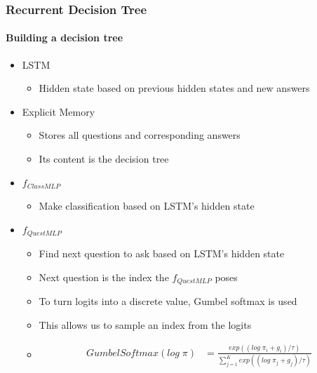 \documentclass[9pt]{beamer}
\begin{document}
\begin{frame}
\frametitle{Recurrent Decision Tree}
\framesubtitle{Building a decision tree}
\begin{itemize}
		\item LSTM
		\begin{itemize}
			\item Hidden state based on previous hidden states and new answers
		\end{itemize}
		\item Explicit Memory
		\begin{itemize}
			\item Stores all questions and corresponding answers
			\item Its content is the decision tree
		\end{itemize}
		\item $f_{ClassMLP}$
		\begin{itemize}
			\item Make classification based on LSTM's hidden state
		\end{itemize}
		\item $f_{QuestMLP}$
		\begin{itemize}
			\item Find next question to ask based on LSTM's hidden state
			\item Next question is the index the $f_{QuestMLP}$ poses
			\item To turn logits into a discrete value, Gumbel softmax is used
			\item This allows us to sample an index from the logits
			\item \begin{align*}
				GumbelSoftmax(log\;\pi) &= \frac{exp((log\;\pi_i + g_i)/\tau)}{\sum_{j=1}^{K}exp((log\;\pi_j + g_j)/\tau)}
			\end{align*}
		\end{itemize}
		
\end{itemize}
\end{frame}
\end{document}
